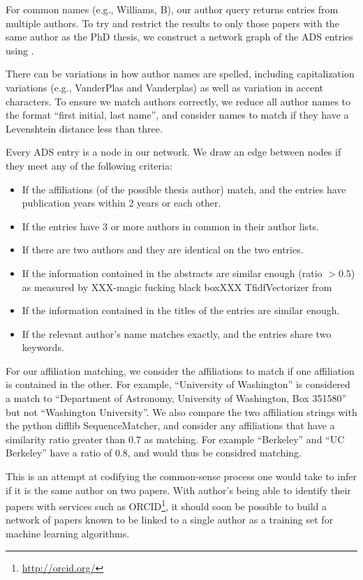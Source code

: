 \documentclass{emulateapj}
\begin{document}
For common names (e.g.,  Williams, B), our author query returns entries from multiple authors.  To try and restrict the results to only those papers with the same author as the PhD thesis, we construct a network graph of the ADS entries using \citet{networkx}.

There can be variations in how author names are spelled, including capitalization variations (e.g., VanderPlas and Vanderplas) as well as variation in accent characters.  To ensure we match authors correctly, we reduce all author names to the format ``first initial, last name'', and consider names to match if they have a Levenshtein distance less than three.

Every ADS entry is a node in our network. We draw an edge between nodes if they meet any of the following criteria:

\begin{itemize}
\item{If the affiliations (of the possible thesis author) match, and the entries have publication years within 2 years or each other.}
\item{If the entries have 3 or more authors in common in their author lists.}
\item{If there are two authors and they are identical on the two entries.}
\item{If the information contained in the abstracts are similar enough (ratio $> 0.5$) as measured by XXX-magic fucking black boxXXX TfidfVectorizer from \citet{scikit-learn}}
\item{If the information contained in the titles of the entries are similar enough.}
  \item{If the relevant author's name matches exactly, and the entries share two keywords.}
\end{itemize}

For our affiliation matching, we consider the affiliations to match if one affiliation is contained in the other.  For example, ``University of Washington'' is considered a match to ``Department of Astronomy, University of Washington, Box 351580'' but not ``Washington University''.  We also compare the two affiliation strings with the python difflib SequenceMatcher, and consider any affiliations that have a similarity ratio greater than 0.7 as matching.  For example ``Berkeley'' and ``UC Berkeley'' have a ratio of 0.8, and would thus be considred matching.

This is an attempt at codifying the common-sense process one would take to infer if it is the same author on two papers. With author's being able to identify their papers with services such as ORCID\footnote{\url{http://orcid.org/}}, it should soon be possible to build a network of papers known to be linked to a single author as a training set for machine learning algorithms.  
\end{document}
